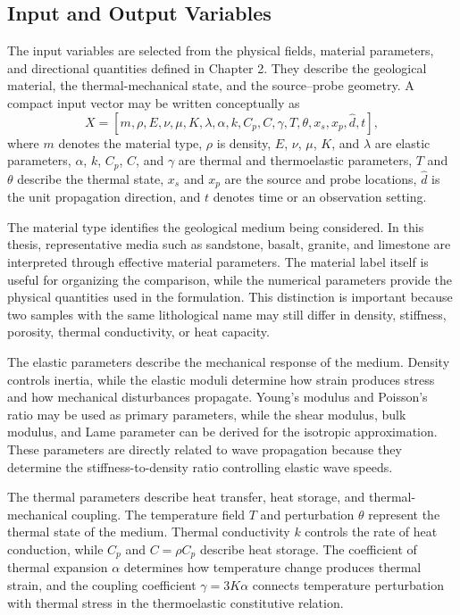 \subsection{Input and Output Variables}

The input variables are selected from the physical fields, material parameters, and directional quantities defined in Chapter 2. They describe the geological material, the thermal-mechanical state, and the source--probe geometry. A compact input vector may be written conceptually as
\begin{equation}
X
=
\left[
m,\rho,E,\nu,\mu,K,\lambda,\alpha,k,C_p,C,\gamma,
T,\theta,x_s,x_p,\hat{d},t
\right],
\end{equation}
where \(m\) denotes the material type, \(\rho\) is density, \(E\), \(\nu\), \(\mu\), \(K\), and \(\lambda\) are elastic parameters, \(\alpha\), \(k\), \(C_p\), \(C\), and \(\gamma\) are thermal and thermoelastic parameters, \(T\) and \(\theta\) describe the thermal state, \(x_s\) and \(x_p\) are the source and probe locations, \(\hat{d}\) is the unit propagation direction, and \(t\) denotes time or an observation setting.

The material type identifies the geological medium being considered. In this thesis, representative media such as sandstone, basalt, granite, and limestone are interpreted through effective material parameters. The material label itself is useful for organizing the comparison, while the numerical parameters provide the physical quantities used in the formulation. This distinction is important because two samples with the same lithological name may still differ in density, stiffness, porosity, thermal conductivity, or heat capacity.

The elastic parameters describe the mechanical response of the medium. Density controls inertia, while the elastic moduli determine how strain produces stress and how mechanical disturbances propagate. Young's modulus and Poisson's ratio may be used as primary parameters, while the shear modulus, bulk modulus, and Lame parameter can be derived for the isotropic approximation. These parameters are directly related to wave propagation because they determine the stiffness-to-density ratio controlling elastic wave speeds.

The thermal parameters describe heat transfer, heat storage, and thermal-mechanical coupling. The temperature field \(T\) and perturbation \(\theta\) represent the thermal state of the medium. Thermal conductivity \(k\) controls the rate of heat conduction, while \(C_p\) and \(C=\rho C_p\) describe heat storage. The coefficient of thermal expansion \(\alpha\) determines how temperature change produces thermal strain, and the coupling coefficient \(\gamma=3K\alpha\) connects temperature perturbation with thermal stress in the thermoelastic constitutive relation.

